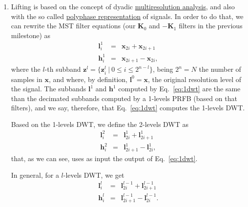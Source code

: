 \begin{enumerate}
\item Lifting is based on the concept of dyadic
  \href{https://en.wikipedia.org/wiki/Multiresolution_analysis}{multiresolution
    analysis}, and also with the so called
  \href{https://en.wikipedia.org/wiki/Polyphase_matrix}{polyphase
    representation} of signals. In order to do that, we can rewrite
  the MST filter equations (our ${\mathbf K}_0$ and $-{\mathbf K}_1$
  filters in the previous milestone) as
  \begin{equation}
    \begin{array}{rcl}
      {\mathbf l}^1_i & = & {\mathbf x}_{2i} + {\mathbf x}_{2i+1} \\
      {\mathbf h}^1_i & = & {\mathbf x}_{2i+1} - {\mathbf x}_{2i},
    \end{array}
    \label{eq:1dwt}
  \end{equation}
  where the $l$-th subband
  ${\mathbf z}^l=\{{\mathbf z}_i^l~|~0\le i\le 2^{n-l}\}$, being
  $2^n=N$ the number of samples in ${\mathbf x}$, and where, by
  definition, ${\mathbf l}^0={\mathbf x}$, the original resolution
  level of the signal. The subbands ${\mathbf l}^1$ and
  ${\mathbf h}^1$ computed by Eq.~\ref{eq:1dwt} are the same than the
  decimated subbands computed by a 1-levels PRFB (based on that
  filters), and we say, therefore, that Eq.~\ref{eq:1dwt} computes the
  1-levels DWT.

  Based on the 1-levels DWT, we define the 2-levels DWT as
  \begin{equation}
    \begin{array}{rcl}
      {\mathbf l}^2_i & = & {\mathbf l}^1_{2i} + {\mathbf l}^1_{2i+1} \\
      {\mathbf h}^2_i & = & {\mathbf l}^1_{2i+1} - {\mathbf l}^1_{2i},
    \end{array}
    \label{eq:2dwt}
  \end{equation}
  that, as we can see, uses as input the output of Eq.~\ref{eq:1dwt}.

  In general, for a $l$-levels DWT, we get
    \begin{equation}
    \begin{array}{rcl}
      {\mathbf l}^l_i & = & {\mathbf l}^{l-1}_{2i} + {\mathbf l}^{l-1}_{2i+1} \\
      {\mathbf h}^l_i & = & {\mathbf l}^{l-1}_{2i+1} - {\mathbf l}^{l-1}_{2i}.
    \end{array}
    \label{eq:ldwt}
  \end{equation}


\end{enumerate}
